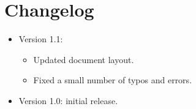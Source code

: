 \chapter{Changelog}
\begin{itemize}
	\item Version 1.1:
	\begin{itemize}
		\item Updated document layout.
		\item Fixed a small number of typos and errors.
	\end{itemize} 
	\item Version 1.0: initial release.
\end{itemize}